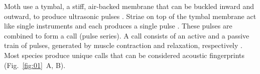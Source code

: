 \documentclass[12pt,a4paper]{article}
\newcommand{\fig}[2]{(Fig.~#1~#2)}
\begin{document}

Moth use a tymbal, a stiff, air-backed membrane that can be buckled inward and outward, to produce ultrasonic pulses \parencite{nuesch_morphologie_1957, fullard_neuroethology_1992,blest_generation_1963}.
Striae on top of the tymbal membrane act like single instruments and each produces a single pulse \parencite{blest_generation_1963, fullard_acoustic_1977, fullard_functional_1990, weller_evolution_1999}. 
These pulses are combined to form a call (pulse series). A call consists of an active and a passive train of pulses, generated by muscle contraction and relaxation, respectively \parencite{corcoran_antibat_2010}.
Most species produce unique calls that can be considered acoustic fingerprints \fig{\ref{fig:01}}{A, B}.
\end{document}

